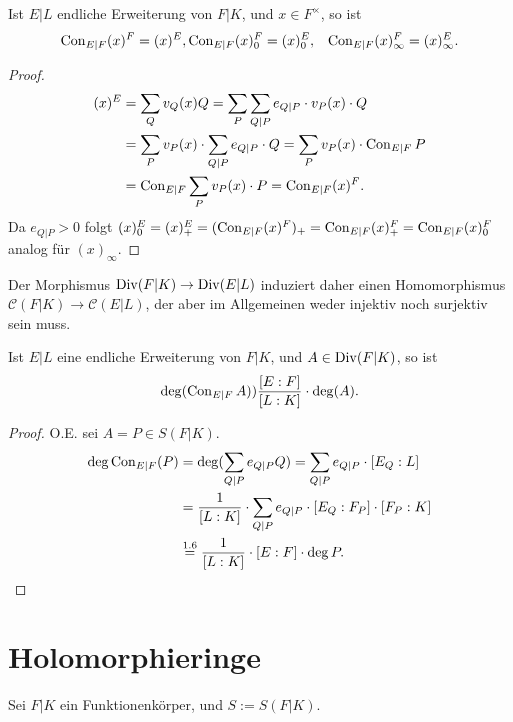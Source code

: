 \begin{lemma}
    Ist $E|L$ endliche Erweiterung von $F|K$, und $x \in F^\times$, so ist
    \begin{align*}
        \operatorname{Con}_{E|F}(x)^F = (x)^E,& \operatorname{Con}_{E|F} (x)_0^F = (x)_0^E,& \operatorname{Con}_{E|F} (x)_\infty^F = (x)_\infty^E.
    \end{align*}
\end{lemma}
\begin{proof}
    \begin{align*}
        (x)^E & = \sum\limits_Q v_Q(x) Q = \sum\limits_P \sum\limits_{Q|P} e_{Q|P} \cdot v_P(x) \cdot Q\\
        & = \sum\limits_P v_P(x) \cdot \sum\limits_{Q|P} e_{Q|P} \cdot Q = \sum\limits_P v_P(x) \cdot \operatorname{Con}_{E|F} P\\
        & = \operatorname{Con}_{E|F} \sum\limits_P v_P(x) \cdot P = \operatorname{Con}_{E|F} (x)^F.
    \end{align*}
    Da $e_{Q|P} > 0$ folgt $(x)^E_0 = (x)^E_+ = (\operatorname{Con}_{E|F} (x)^F)_+ = \operatorname{Con}_{E|F} (x)^F_+ = \operatorname{Con}_{E|F}(x)^F_0$
    analog für $(x)_\infty$.

\end{proof}

\begin{bemerkungnr}
    Der Morphismus $\operatorname{Div}(F|K) \to \operatorname{Div}(E|L)$ induziert daher einen Homomorphismus
    $\mathscr{C}(F|K) \to \mathscr{C}(E|L)$, der aber im Allgemeinen weder injektiv noch surjektiv sein muss. 
\end{bemerkungnr}

\begin{satz}
    Ist $E|L$ eine endliche Erweiterung von $F|K$, und $A \in \operatorname{Div}(F|K)$, so ist
    $$ \deg (\operatorname{Con}_{E|F}A) ) \frac{[E:F]}{[L:K]} \cdot \deg (A). $$
\end{satz}
\begin{proof}
    O.E. sei $A = P \in S(F|K)$.
    \begin{align*}
        \deg \operatorname{Con}_{E|F}(P) & = \deg ( \sum\limits_{Q|P} e_{Q|P}Q) = \sum\limits_{Q|P}e_{Q|P}\cdot [E_Q:L]\\
        & = \frac{1}{[L:K]}\cdot \sum\limits_{Q|P} e_{Q|P} \cdot [E_Q: F_P] \cdot [F_P : K]\\
        & \stackrel{1.6}{=} \frac{1}{[L:K]} \cdot [E:F] \cdot \deg P.
    \end{align*}
\end{proof}

\section{Holomorphieringe}
Sei $F|K$ ein Funktionenkörper, und $S := S(F|K)$.

